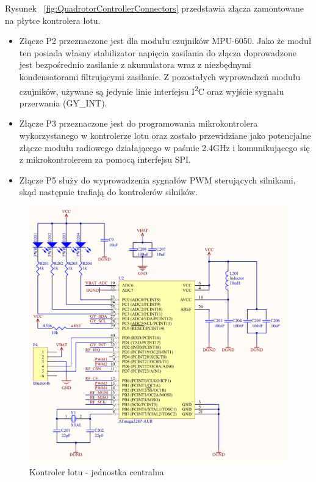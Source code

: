 Rysunek ~\ref{fig:QuadrotorControllerConnectors} przedstawia złącza zamontowane na płytce kontrolera lotu. 
\begin{itemize}
	\item Złącze P2 przeznaczone jest dla modułu czujników MPU-6050. Jako że moduł ten posiada własny stabilizator napięcia zasilania do złącza doprowadzone jest bezpośrednio zasilanie z akumulatora wraz z niezbędnymi kondensatorami filtrującymi zasilanie. Z pozostałych wyprowadzeń modułu czujników, używane są jedynie linie interfejsu I\textsuperscript{2}C oraz wyjście sygnału przerwania (GY\_INT).
	\item Złącze P3 przeznaczone jest do programowania mikrokontrolera wykorzystanego w kontrolerze lotu oraz zostało przewidziane jako potencjalne złącze modułu radiowego działającego w paśmie 2.4GHz i komunikującego się z mikrokontrolerem za pomocą interfejsu SPI.  
	\item Złącze P5 służy do wyprowadzenia sygnałów PWM sterujących silnikami, skąd następnie trafiają do kontrolerów silników.
\end{itemize}

\begin{figure}[H]
	\centering
	\includegraphics[scale=0.37]{Pictures/QuadroController_Main_C.png}
		\caption[Kontroler lotu - jednostka centralna]{Kontroler lotu - jednostka centralna}
	\label{fig:QuadrotorControllerMain}
\end{figure}

